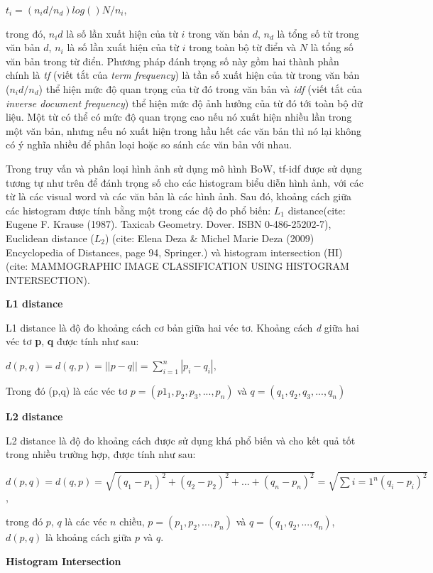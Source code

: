 $t_i = (n_id/n_d)log()N/n_i$,

trong đó, $n_id$ là số lần xuất hiện của từ $i$ trong văn bản $d$, $n_d$ là tổng số từ trong văn bản $d$, $n_i$ là số lần xuất hiện của từ $i$ trong toàn bộ từ điển và $N$ là tổng số văn bản trong từ điển. Phương pháp đánh trọng số này gồm hai thành phần chính là \textit{tf} (viết tắt của \textit{term frequency}) là tần số xuất hiện của từ trong văn bản ($n_id/n_d$) thể hiện mức độ quan trọng của từ đó trong văn bản và \textit{idf} (viết tắt của \textit{inverse document frequency}) thể hiện mức độ ảnh hưởng của từ đó tới toàn bộ dữ liệu. Một từ có thể có mức độ quan trọng cao nếu nó xuất hiện nhiều lần trong một văn bản, nhưng nếu nó xuất hiện trong hầu hết các văn bản thì nó lại không có ý nghĩa nhiều để phân loại hoặc so sánh các văn bản với nhau.

Trong truy vấn và phân loại hình ảnh sử dụng mô hình BoW, tf-idf được sử dụng tương tự như trên để đánh trọng số cho các histogram biểu diễn hình ảnh, với các từ là các visual word và các văn bản là các hình ảnh. Sau đó, khoảng cách giữa các histogram được tính bằng một trong các độ đo phổ biến: $L_1$ distance(cite: Eugene F. Krause (1987). Taxicab Geometry. Dover. ISBN 0-486-25202-7), Euclidean distance ($L_2$) (cite: Elena Deza & Michel Marie Deza (2009) Encyclopedia of Distances, page 94, Springer.) và histogram intersection (HI) (cite: MAMMOGRAPHIC IMAGE CLASSIFICATION USING HISTOGRAM INTERSECTION).

\textbf{L1 distance}

L1 distance là độ đo khoảng cách cơ bản giữa hai véc tơ. Khoảng cách \textit{d} giữa hai véc tơ \textbf{p}, \textbf{q} được tính như sau:

$d(p,q) = d(q,p) = ||p-q|| = \sum\limits_{i=1}^n |p_i - q_i|,$

Trong đó (p,q) là các véc tơ $p = (p1_1, p_2, p_3, ..., p_n)$ và $q = (q_1, q_2, q_3, ..., q_n)$

\textbf{L2 distance}

L2 distance là độ đo khoảng cách được sử dụng khá phổ biến và cho kết quả tốt trong nhiều trường hợp, được tính như sau:

$d(p,q) = d(q,p) = \sqrt{(q_1-p_1)^2 + (q_2-p_2)^2 + ... + (q_n-p_n)^2} = \sqrt{\sum\limits{i=1}^n (q_i - p_i)^2}$,

trong đó $p$, $q$ là các véc $n$ chiều, $p = (p_1, p_2, ..., p_n)$ và $q = (q_1, q_2, ..., q_n)$, $d(p,q)$ là khoảng cách giữa $p$ và $q$.

\textbf{Histogram Intersection}

